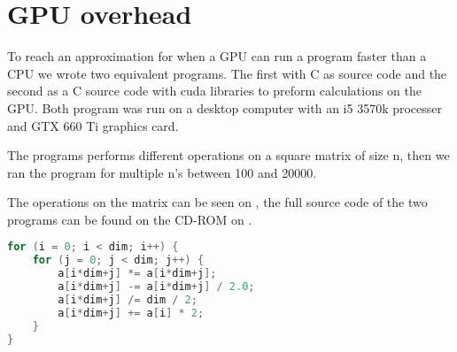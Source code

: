 \chapter{GPU overhead}
\label{app:gpuoverhead}
To reach an approximation for when a GPU can run a program faster than a CPU  we wrote two equivalent programs.
The first with C as source code and the second as a C source code with \gls{cuda} libraries to preform calculations on the GPU.
Both program was run on a desktop computer with an i5 3570k processer and GTX 660 Ti graphics card.

The programs performs different operations on a square matrix of size n, then we ran the program for multiple n's between 100 and 20000.

The operations on the matrix can be seen on , the full source code of the two programs can be found on the CD-ROM on .

\begin{lstlisting}[language=C,caption={Operations on the matrix},label=gpuoversource,frame=single]
for (i = 0; i < dim; i++) {
	for (j = 0; j < dim; j++) {
		a[i*dim+j] *= a[i*dim+j];
		a[i*dim+j] -= a[i*dim+j] / 2.0;
		a[i*dim+j] /= dim / 2;
		a[i*dim+j] += a[i] * 2;
	}
}
\end{lstlisting}

